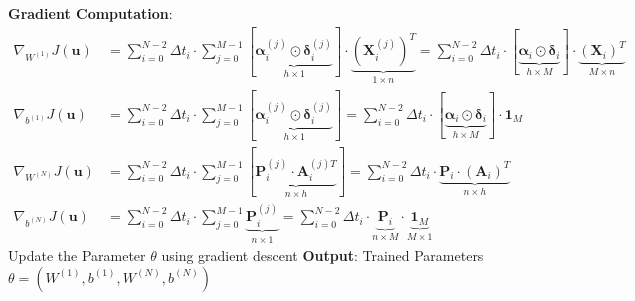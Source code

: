 \documentclass[a4paper, 12pt]{scrartcl}
\begin{document}
\begin{algorithm}
\begin{algorithmic}[1]
            \State \textbf{Gradient Computation}: 
            \State 
            $\begin{aligned}
                \nabla_{W^{(1)}} J(\bm{u})
                &=
                \sum_{i=0}^{N-2} \Delta t_i \cdot 
                \sum_{j=0}^{M-1}
                \left[
                    \underbrace{
                        \bm{\alpha}_i^{(j)} \odot \bm{\delta}_i^{(j)}
                    }_{h \times 1} 
                \right] 
                \cdot \underbrace{\left(\bm{X}_i^{(j)}\right)^T}_{1 \times n}
                =
                \sum_{i=0}^{N-2} \Delta t_i \cdot 
                \left[
                    \underbrace{
                        \bm{\alpha}_i \odot \bm{\delta}_i
                    }_{h \times M} 
                \right]
                \cdot \underbrace{\left(\bm{X}_i\right)^T}_{M \times n}
                \\
                \nabla_{b^{(1)}} J(\bm{u})
                &=
                \sum_{i=0}^{N-2} \Delta t_i \cdot
                \sum_{j=0}^{M-1}
                \left[
                    \underbrace{\bm{\alpha}_i^{(j)} \odot \bm{\delta}_i^{(j)}}_{h \times 1}
                \right] 
                =
                \sum_{i=0}^{N-2} \Delta t_i \cdot
                \left[
                    \underbrace{\bm{\alpha}_i \odot \bm{\delta}_i}_{h \times M}
                \right] 
                \cdot \bm{1}_{M}
                \\
                \nabla_{W^{(N)}} J(\bm{u})
                &=
                \sum_{i=0}^{N-2} \Delta t_i \cdot
                \sum_{j=0}^{M-1}
                \left[
                    \underbrace{\bm{P}_i^{(j)} \cdot \bm{A}_i^{(j)T}}_{n \times h} 
                \right] 
                = 
                \sum_{i=0}^{N-2} \Delta t_i \cdot \underbrace{\bm{P}_i \cdot \left(\bm{A}_i\right)^T}_{n \times h}
                \\
                \nabla_{b^{(N)}} J(\bm{u})
                &=
                \sum_{i=0}^{N-2} \Delta t_i \cdot
                \sum_{j=0}^{M-1}
                \underbrace{\bm{P}_i^{(j)}}_{n \times 1}
                =
                \sum_{i=0}^{N-2} \Delta t_i \cdot 
                \underbrace{\bm{P}_i}_{n \times M} 
                \cdot 
                \underbrace{\bm{1}_M}_{M \times 1}
            \end{aligned}$
            \State Update the Parameter $\theta$ using gradient descent
        \EndFor
        \State \textbf{Output}: Trained Parameters $\theta = (W^{(1)}, b^{(1)}, W^{(N)}, b^{(N)})$
    \end{algorithmic}
\end{algorithm}
\end{document}
